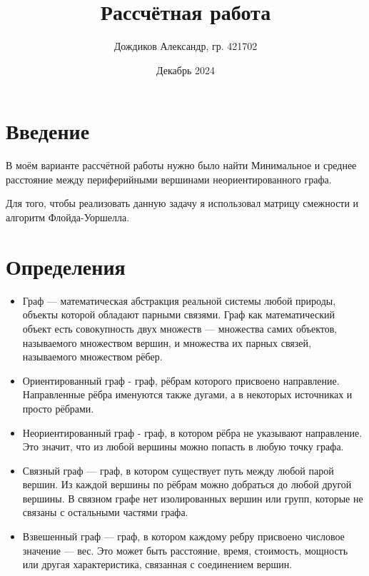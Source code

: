 \documentclass[14 pt]{article}
\title{Рассчётная работа}
\author{Дождиков Александр, гр. 421702}
\date{Декабрь 2024}
\begin{document}
\large
\maketitle
\newpage

\section{Введение}
\begin{введение}
В моём варианте рассчётной работы нужно было найти Минимальное и среднее расстояние между периферийными вершинами неориентированного графа.

Для того, чтобы реализовать данную задачу я использовал матрицу смежности и алгоритм Флойда-Уоршелла.
\end{введение}

\section{Определения}
\begin{определения}
\begin{itemize}
    \item Граф — математическая абстракция реальной системы любой природы, объекты которой обладают парными связями. Граф как математический объект есть совокупность двух множеств — множества самих объектов, называемого множеством вершин, и множества их парных связей, называемого множеством рёбер.

    \item Ориентированный граф - граф, рёбрам которого присвоено направление. Направленные рёбра именуются также дугами, а в некоторых источниках и просто рёбрами.

    \item Неориентированный граф - граф, в котором рёбра не указывают направление. Это значит, что из любой вершины можно попасть в любую точку графа.

    \item Связный граф — граф, в котором существует путь между любой парой вершин. Из каждой вершины по рёбрам можно добраться до любой другой вершины. В связном графе нет изолированных вершин или групп, которые не связаны с остальными частями графа.

    \item Взвешенный граф — граф, в котором каждому ребру присвоено числовое значение — вес. Это может быть расстояние, время, стоимость, мощность или другая характеристика, связанная с соединением вершин.
\end{itemize}
\end{определения}
\end{document}
